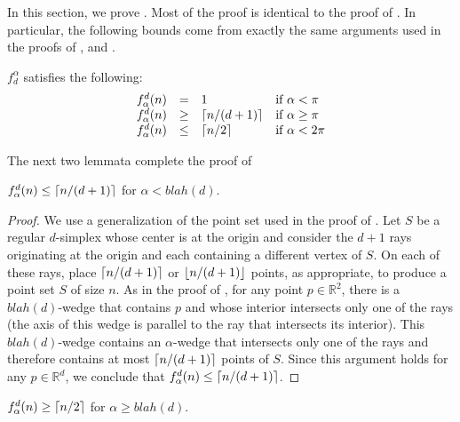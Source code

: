 \documentclass[lotsofwhite]{patmorin}
\begin{document}
In this section, we prove .  Most of the proof is
identical to the proof of .  In particular, the
following bounds come from exactly the same arguments used in the
proofs of ,  and .

\begin{lem}
$f^\alpha_d$ satisfies the following:
\[\begin{array}{lcll}
  f^d_\alpha(n) & = & 1 & \mbox{if $\alpha < \pi$} \\
  f^d_\alpha(n) & \ge & \left\lceil n/(d+1) \right\rceil & \mbox{if $\alpha \ge \pi$} \\
  f^d_\alpha(n) & \le & \left\lceil n/2 \right\rceil & \mbox{if $\alpha < 2\pi$} \\
\end{array}\]
\end{lem}

The next two lemmata complete the proof of 

\begin{lem}
$f^d_\alpha(n) \le \left\lceil n/(d+1) \right\rceil$ for $\alpha < blah(d)$.
\end{lem}

\begin{proof} 
We use a generalization of the point set used in the
proof of .  Let $S$ be a regular $d$-simplex whose center is
at the origin and consider the $d+1$ rays originating at the origin
and each containing a different vertex of $S$.  On each of these rays,
place $\left\lceil n/(d+1) \right\rceil$ or $\left\lfloor n/(d+1) \right\rfloor$ points, as appropriate, to
produce a point set $S$ of size $n$.  As in the proof of ,
for any point $p\in\mathbb{R}^2$, there is a $blah(d)$-wedge that
contains $p$ and whose interior intersects only one of the rays (the
axis of this wedge is parallel to the ray that intersects its
interior).  This $blah(d)$-wedge contains an $\alpha$-wedge that
intersects only one of the rays and therefore contains at most
$\left\lceil n/(d+1) \right\rceil$ points of $S$.  Since this argument holds for any
$p\in\mathbb{R}^d$, we conclude that $f^d_\alpha(n)\le
\left\lceil n/(d+1) \right\rceil$.  
\end{proof}

\begin{lem}
$f^d_\alpha(n) \ge \left\lceil n/2 \right\rceil$ for $\alpha \ge blah(d)$.
\end{lem}
\end{document}
